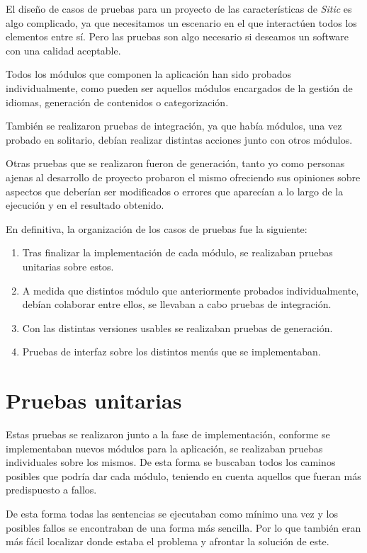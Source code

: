El diseño de casos de pruebas para un proyecto de las características de \emph{Sitic}
es algo complicado, ya que necesitamos un escenario en el que interactúen todos los
elementos entre sí. Pero las pruebas son algo necesario si deseamos un software con una
calidad aceptable.

Todos los módulos que componen la aplicación han sido probados individualmente, como pueden
ser aquellos módulos encargados de la gestión de idiomas, generación de contenidos o categorización.

También se realizaron pruebas de integración, ya que había módulos, una vez probado en solitario,
debían realizar distintas acciones junto con otros módulos.

Otras pruebas que se realizaron fueron de generación, tanto yo como
personas ajenas al desarrollo de proyecto probaron el
mismo ofreciendo sus opiniones sobre aspectos que deberían ser modificados o
errores que aparecían a lo largo de la ejecución y en el resultado obtenido.

En definitiva, la organización de los casos de pruebas fue la siguiente:

\begin{enumerate}
    \item Tras finalizar la implementación de cada módulo, se realizaban pruebas unitarias sobre estos.
    \item A medida que distintos módulo que anteriormente probados individualmente, debían colaborar entre ellos, se
    llevaban a cabo pruebas de integración.
    \item Con las distintas versiones usables se realizaban pruebas de generación.
    \item Pruebas de interfaz sobre los distintos menús que se implementaban.
\end{enumerate}

\section{Pruebas unitarias}

Estas pruebas se realizaron junto a la fase de implementación, conforme se implementaban nuevos módulos para la aplicación,
se realizaban pruebas individuales sobre los mismos. De esta forma se buscaban todos los caminos posibles que podría dar cada
módulo, teniendo en cuenta aquellos que fueran más predispuesto a fallos.

De esta forma todas las sentencias se ejecutaban como mínimo una vez y los posibles fallos se encontraban de una forma más sencilla.
Por lo que también eran más fácil localizar donde estaba el problema y afrontar la solución de este.

